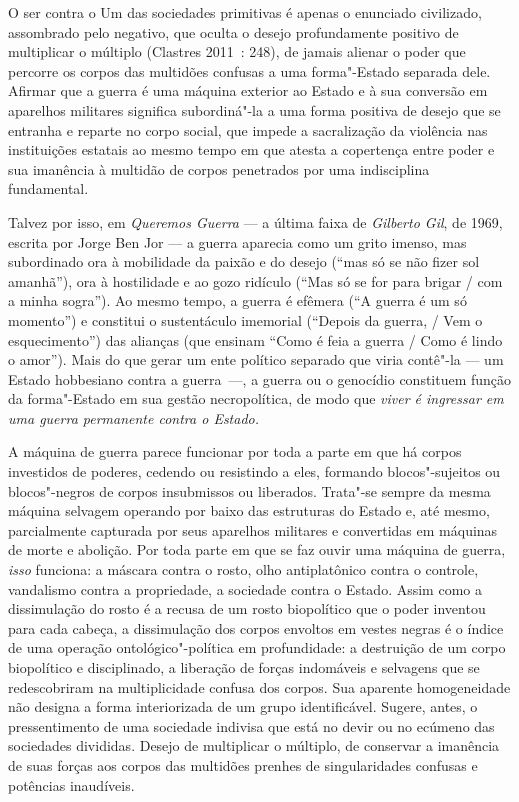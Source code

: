 O ser contra o Um das sociedades primitivas é apenas o enunciado
civilizado, assombrado pelo negativo, que oculta o desejo profundamente
positivo de multiplicar o múltiplo (Clastres 2011~: 248), de jamais
alienar o poder que percorre os corpos das multidões confusas a uma
forma"-Estado separada dele. Afirmar que a guerra é uma máquina exterior
ao Estado e à sua conversão em aparelhos militares significa
subordiná"-la a uma forma positiva de desejo que se entranha e reparte no
corpo social, que impede a sacralização da violência nas instituições
estatais ao mesmo tempo em que atesta a copertença entre poder e sua
imanência à multidão de corpos penetrados por uma indisciplina
fundamental.

Talvez por isso, em \emph{Queremos Guerra} --- a última faixa de
\emph{Gilberto Gil}, de 1969, escrita por Jorge Ben Jor --- a guerra
aparecia como um grito imenso, mas subordinado ora à mobilidade da
paixão e do desejo (``mas só se não fizer sol amanhã''), ora à
hostilidade e ao gozo ridículo (``Mas só se for para brigar / com a
minha sogra''). Ao mesmo tempo, a guerra é efêmera (``A guerra é um só
momento'') e constitui o sustentáculo imemorial (``Depois da guerra, /
Vem o esquecimento'') das alianças (que ensinam ``Como é feia a guerra /
Como é lindo o amor''). Mais do que gerar um ente político separado que
viria contê"-la --- um Estado hobbesiano contra a guerra~---, a guerra ou o
genocídio constituem função da forma"-Estado em sua gestão necropolítica,
de modo que \emph{viver é ingressar em uma guerra permanente contra o
Estado.}

A máquina de guerra parece funcionar por toda a parte em que há corpos
investidos de poderes, cedendo ou resistindo a eles, formando
blocos"-sujeitos ou blocos"-negros de corpos insubmissos ou liberados.
Trata"-se sempre da mesma máquina selvagem operando por baixo das
estruturas do Estado e, até mesmo, parcialmente capturada por seus
aparelhos militares e convertidas em máquinas de morte e abolição. Por
toda parte em que se faz ouvir uma máquina de guerra, \emph{isso
}funciona: a máscara contra o rosto, olho antiplatônico contra o
controle, vandalismo contra a propriedade, a sociedade contra o Estado.
Assim como a dissimulação do rosto é a recusa de um rosto biopolítico
que o poder inventou para cada cabeça, a dissimulação dos corpos
envoltos em vestes negras é o índice de uma operação ontológico"-política
em profundidade: a destruição de um corpo biopolítico e disciplinado, a
liberação de forças indomáveis e selvagens que se redescobriram na
multiplicidade confusa dos corpos. Sua aparente homogeneidade não
designa a forma interiorizada de um grupo identificável. Sugere, antes,
o pressentimento de uma sociedade indivisa que está no devir ou no
ecúmeno das sociedades divididas. Desejo de multiplicar o múltiplo, de
conservar a imanência de suas forças aos corpos das multidões prenhes de
singularidades confusas e potências inaudíveis.


